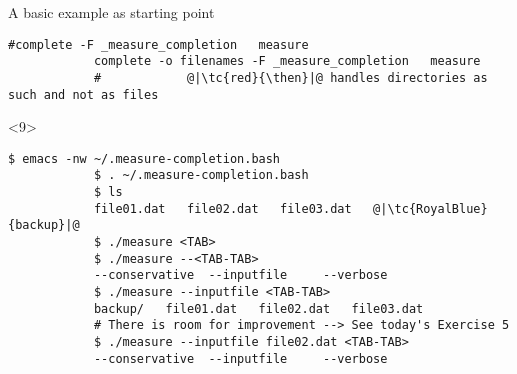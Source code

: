 \begin{frame}[fragile]{A basic example as starting point}
\begin{onlyenv}
\begin{lstlisting}[style=myBash, numbers=none, style=smaller]
            #complete -F _measure_completion   measure
            complete -o filenames -F _measure_completion   measure
            #            @|\tc{red}{\then}|@ handles directories as such and not as files
        \end{lstlisting}
    \end{onlyenv}
    \begin{onlyenv}<9>
        \begin{lstlisting}[style=myBash, numbers=none, aboveskip=4mm]
            $ emacs -nw ~/.measure-completion.bash
            $ . ~/.measure-completion.bash
            $ ls
            file01.dat   file02.dat   file03.dat   @|\tc{RoyalBlue}{backup}|@
            $ ./measure <TAB>
            $ ./measure --<TAB-TAB>
            --conservative  --inputfile     --verbose
            $ ./measure --inputfile <TAB-TAB>
            backup/   file01.dat   file02.dat   file03.dat
            # There is room for improvement --> See today's Exercise 5
            $ ./measure --inputfile file02.dat <TAB-TAB>
            --conservative  --inputfile     --verbose
        \end{lstlisting}
    \end{onlyenv}
\end{frame}
